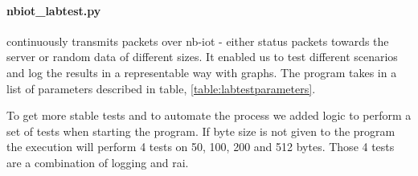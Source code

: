 \documentclass[USenglish]{ifimaster}  %
\begin{document}
\paragraph{\textbf{nbiot\_labtest.py}} continuously transmits packets over \acrshort{nb-iot} - either status packets towards the server or random data of different sizes. It enabled us to test different scenarios and log the results in a representable way with graphs. The program takes in a list of parameters described in table, \vref{table:labtestparameters}.

\begin{table}[H]
\centering
{}
\caption[\textbf{nbiot\_labtest.py} parameters]{\textbf{nbiot\_labtest.py} parameters. See \href{https://github.com/henninghaakonsen/thesis/blob/master/code/nbiot_labtest.py}{\acrshort{nb-iot} labtest}\cite{code:nbiotlabtest} for complete code}
\label{table:labtestparameters}
\end{table}

To get more stable tests and to automate the process we added logic to perform a set of tests when starting the program. If byte size is not given to the program the execution will perform 4 tests on 50, 100, 200 and 512 bytes. Those 4 tests are a combination of logging and \acrshort{rai}.
\end{document}
